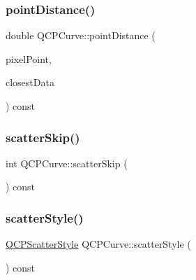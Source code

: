 \mbox{\label{class_q_c_p_curve_aa2c9c9c0e57f11f18a5cb7e47927157c}} 
\subsubsection{\texorpdfstring{point\+Distance()}{pointDistance()}}
{\footnotesize\ttfamily double Q\+C\+P\+Curve\+::point\+Distance (\begin{DoxyParamCaption}\item[{const Q\+PointF \&}]{pixel\+Point,  }\item[{\hyperlink{class_q_c_p_data_container_ae40a91f5cb0bcac61d727427449b7d15}{Q\+C\+P\+Curve\+Data\+Container\+::const\+\_\+iterator} \&}]{closest\+Data }\end{DoxyParamCaption}) const\hspace{0.3cm}{\ttfamily [protected]}}

\mbox{\label{class_q_c_p_curve_a09b33217172aedf6c62c441b4ff66166}} 
\subsubsection{\texorpdfstring{scatter\+Skip()}{scatterSkip()}}
{\footnotesize\ttfamily int Q\+C\+P\+Curve\+::scatter\+Skip (\begin{DoxyParamCaption}{ }\end{DoxyParamCaption}) const\hspace{0.3cm}{\ttfamily [inline]}}

\mbox{\label{class_q_c_p_curve_afa6bd72a3a331a5ed45d3e0c5843b592}} 
\subsubsection{\texorpdfstring{scatter\+Style()}{scatterStyle()}}
{\footnotesize\ttfamily \hyperlink{class_q_c_p_scatter_style}{Q\+C\+P\+Scatter\+Style} Q\+C\+P\+Curve\+::scatter\+Style (\begin{DoxyParamCaption}{ }\end{DoxyParamCaption}) const\hspace{0.3cm}{\ttfamily [inline]}}

